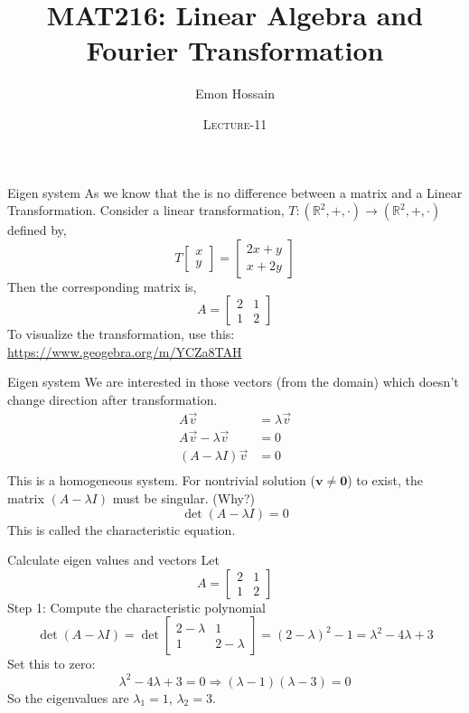 \documentclass[11pt]{beamer}
\author[] %
{Emon Hossain\inst{1}}
\institute[University of Dhaka] %
{
  \inst{1}%
  Lecturer\\MNS department\\Brac University
}
\date[] %
{\textsc{Lecture-11}}
\title[]{MAT216: Linear Algebra and Fourier Transformation}
\theoremstyle{plain}
\begin{document}
\begin{frame}
\titlepage
\end{frame}

\begin{frame}{Eigen system}
As we know that the is no difference between a matrix and a Linear Transformation. Consider a linear transformation, $T:(\mathbb R^2,+,\cdot)\rightarrow(\mathbb R^2,+,\cdot)$ defined by, $$T\begin{bmatrix}
    x\\y
\end{bmatrix}=\begin{bmatrix}
    2x+y\\x+2y
\end{bmatrix}$$ 
Then the corresponding matrix is, 
$$A={\begin{bmatrix}2&1\\1&2\end{bmatrix}}$$
To visualize the transformation, use this: \url{https://www.geogebra.org/m/YCZa8TAH}
\end{frame}

\begin{frame}{Eigen system}
We are interested in those vectors (from the domain) which doesn't change direction after transformation. 
\begin{align*}
A \vec{v} &= \lambda \vec{v}\\
A \vec{v} - \lambda \vec{v} &= 0\\
(A - \lambda I) \vec{v} &= 0\\
\end{align*}
This is a homogeneous system. For nontrivial solution ($\mathbf{v} \ne \mathbf{0}$) to exist, the matrix $(A - \lambda I)$ must be singular. (Why?)
$$
\det(A - \lambda I) = 0
$$
This is called the characteristic equation. 
\end{frame}

\begin{frame}{Calculate eigen values and vectors}
Let
$$
A = \begin{bmatrix}
2 & 1 \\
1 & 2
\end{bmatrix}
$$
Step 1: Compute the characteristic polynomial
$$
\det(A - \lambda I) = \det\begin{bmatrix}
2 - \lambda & 1 \\
1 & 2 - \lambda
\end{bmatrix}
= (2 - \lambda)^2 - 1 = \lambda^2 - 4\lambda + 3
$$
Set this to zero:
$$
\lambda^2 - 4\lambda + 3 = 0 \Rightarrow (\lambda - 1)(\lambda - 3) = 0
$$
So the eigenvalues are $\lambda_1 = 1$, $\lambda_2 = 3$.
\end{frame}
\end{document}
